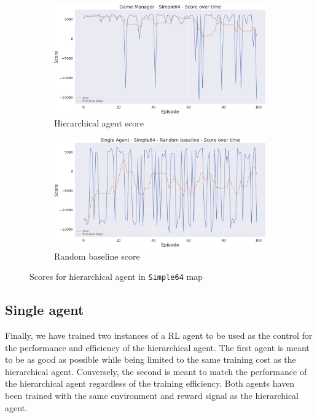\begin{figure}[t]
    \centering
    \begin{subfigure}[b]{0.495\textwidth}
        \includegraphics[width=1\textwidth]{figs/multi_dqn_game_manager/exploit/score.png}
        \caption{Hierarchical agent score}
    \end{subfigure}
    \begin{subfigure}[b]{0.495\textwidth}
        \includegraphics[width=1\textwidth]{figs/single_random/exploit/score.png}
        \caption{Random baseline score}
    \end{subfigure}
    \caption{Scores for hierarchical agent in \texttt{Simple64} map}
    \label{fig:hierarchical_Simple64_scores}
\end{figure}

\subsection{Single agent}

Finally, we have trained two instances of a RL agent to be used as the control for the performance and efficiency of the hierarchical agent. The first agent is meant to be as good as possible while being limited to the same training cost as the hierarchical agent. Conversely, the second is meant to match the performance of the hierarchical agent regardless of the training efficiency. Both agents haven been trained with the same environment and reward signal as the hierarchical agent.

